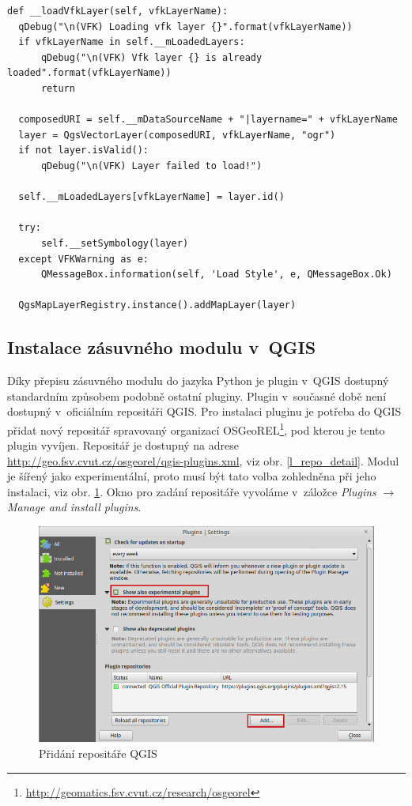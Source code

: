 \documentclass[a4paper,12pt,oneside]{book}
\begin{document}
{\scriptsize
\begin{lstlisting}[style=python, 
		    caption=Kód pro načtení vektorové vrstvy v~jazyce Python,
		    label=l_loadLayerPython]
def __loadVfkLayer(self, vfkLayerName):
  qDebug("\n(VFK) Loading vfk layer {}".format(vfkLayerName))
  if vfkLayerName in self.__mLoadedLayers:
      qDebug("\n(VFK) Vfk layer {} is already loaded".format(vfkLayerName))
      return

  composedURI = self.__mDataSourceName + "|layername=" + vfkLayerName
  layer = QgsVectorLayer(composedURI, vfkLayerName, "ogr")
  if not layer.isValid():
      qDebug("\n(VFK) Layer failed to load!")

  self.__mLoadedLayers[vfkLayerName] = layer.id()

  try:
      self.__setSymbology(layer)
  except VFKWarning as e:
      QMessageBox.information(self, 'Load Style', e, QMessageBox.Ok)

  QgsMapLayerRegistry.instance().addMapLayer(layer)
\end{lstlisting}
}

\subsection{Instalace zásuvného modulu v~QGIS}
Díky přepisu zásuvného modulu do jazyka Python je plugin v~QGIS
dostupný standardním způsobem podobně ostatní pluginy. Plugin
v~současné době není dostupný v~oficiálním repositáři QGIS. Pro
instalaci pluginu je potřeba do QGIS přidat nový repositář spravovaný
organizací
OSGeoREL\footnote{\url{http://geomatics.fsv.cvut.cz/research/osgeorel}},
pod kterou je tento plugin vyvíjen. Repositář je dostupný na adrese
\url{http://geo.fsv.cvut.cz/osgeorel/qgis-plugins.xml}, viz
obr. \ref{l_repo_detail}. Modul je šířený jako experimentální, proto
musí být tato volba zohledněna při jeho instalaci, viz
obr. \ref{l_qgis_plugins}. Okno pro zadání repositáře vyvoláme
v~záložce \textit{Plugins} $\rightarrow$ \textit{Manage and install
  plugins}.

\begin{figure}[htb]
\centering
\includegraphics[width=.7\textwidth]{images/qgis_repo_plugins.png}
\caption[Přidání repositáře QGIS]{Přidání repositáře QGIS}
\label{l_qgis_plugins}
\end{figure}
\end{document}
